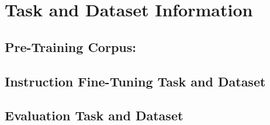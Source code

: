 \section{Task and Dataset Information}
\label{app:task}

\subsection{Pre-Training Corpus: \dataset}
\label{app:data-pretrain}


\subsection{Instruction Fine-Tuning Task and Dataset}
\label{app:data-ift}


\subsection{Evaluation Task and Dataset}
\label{app:data}




